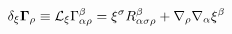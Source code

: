 \begin{equation}
\delta _{\xi }{\bf \Gamma }_{\rho }\equiv {\cal L}_{\xi }\Gamma
_{\alpha \rho }^{\beta }=\xi ^{\sigma }R_{\alpha \sigma \rho
}^{\beta }+ \nabla _{\rho}\nabla _{\alpha }\xi ^{\beta }
\label{eqn:32}
\end{equation}

